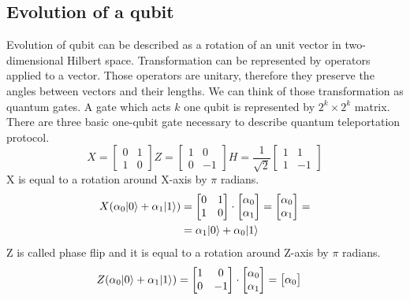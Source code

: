 \begin{multicols*}{2}
\section{Evolution of  a qubit}
Evolution of qubit can be described as a rotation of an unit vector in two-dimensional Hilbert space. Transformation can be represented by operators applied to a vector. Those operators are unitary, therefore they preserve the angles between vectors and their lengths. We can think of those transformation as quantum gates. A gate which acts $k$ one qubit is represented by $2^k\times 2^k$ matrix. There are three basic one-qubit gate necessary to describe quantum teleportation protocol.
\[
X = 
\begin{bmatrix}
0 & 1\\
1 & 0
\end{bmatrix}
Z = 
\begin{bmatrix}
1 & 0\\
0 & -1
\end{bmatrix}
H = \frac{1}{\sqrt{2}} 
\begin{bmatrix}
1 & 1\\
1 & -1
\end{bmatrix}
\]
X is equal to a rotation around X-axis by $\pi$ radians.
\begin{align*}
X(\alpha_0{\left\vert{0}\right\rangle} + \alpha_1{\left\vert{1}\right\rangle}) &=
\begin{bmatrix}
0 & 1\\
1 & 0
\end{bmatrix}
\cdot
\begin{bmatrix}
\alpha_0\\
\alpha_1
\end{bmatrix}
=
\begin{bmatrix}
\alpha_0\\
\alpha_1
\end{bmatrix} = \\
&= \alpha_1{\left\vert{0}\right\rangle} + \alpha_0{\left\vert{1}\right\rangle}
\end{align*}
Z is called phase flip and it is equal to a rotation around Z-axis by $\pi$ radians.
\begin{align*}
Z(\alpha_0{\left\vert{0}\right\rangle} + \alpha_1{\left\vert{1}\right\rangle}) &=
\begin{bmatrix}
1 & 0\\
0 & -1
\end{bmatrix}
\cdot
\begin{bmatrix}
\alpha_0\\
\alpha_1
\end{bmatrix}
=
\begin{bmatrix}
\alpha_0\\

\end{bmatrix}
\end{align*}
\end{multicols*}
